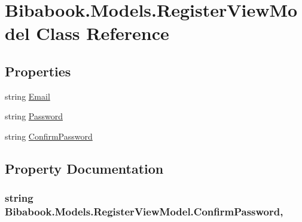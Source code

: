 \hypertarget{class_bibabook_1_1_models_1_1_register_view_model}{}\section{Bibabook.\+Models.\+Register\+View\+Model Class Reference}
\label{class_bibabook_1_1_models_1_1_register_view_model}
\subsection*{Properties}
\begin{DoxyCompactItemize}
\item 
string \hyperlink{class_bibabook_1_1_models_1_1_register_view_model_a8f0dd5aedc3ea8eac91f58acb04c85a8}{Email}
\item 
string \hyperlink{class_bibabook_1_1_models_1_1_register_view_model_a43dcf95b106a6bf8476732ef38f23efb}{Password}
\item 
string \hyperlink{class_bibabook_1_1_models_1_1_register_view_model_a953692346157326f0bf0c53fcf32155c}{Confirm\+Password}
\end{DoxyCompactItemize}


\subsection{Property Documentation}
\hypertarget{class_bibabook_1_1_models_1_1_register_view_model_a953692346157326f0bf0c53fcf32155c}{}
\subsubsection[{Confirm\+Password}]{\setlength{\rightskip}{0pt plus 5cm}string Bibabook.\+Models.\+Register\+View\+Model.\+Confirm\+Password\hspace{0.3cm}{\ttfamily [get]}, {\ttfamily [set]}}\label{class_bibabook_1_1_models_1_1_register_view_model_a953692346157326f0bf0c53fcf32155c}
\hypertarget{class_bibabook_1_1_models_1_1_register_view_model_a8f0dd5aedc3ea8eac91f58acb04c85a8}{}

